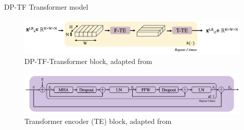\documentclass{beamer}
\begin{document}
\begin{frame}[t]{DP-TF Transformer model}

    \hspace{0.2cm}
    
    \begin{figure}
        \centering
        \includegraphics[scale=.47]{MA_presentation/figures/dp_transformer_block.png}
        \caption{DP-TF-Transformer block, adapted from \cite{hinderer_blind_2022}}
        \label{dp-tf transformer block}
    \end{figure}


    \begin{figure}
        \centering
        \includegraphics[scale=.38]{MA_presentation/figures/transformer_block.png}
        \caption{Transformer encoder (TE) block, adapted from \cite{hinderer_blind_2022}}
    \end{figure}

\end{frame}
\end{document}
